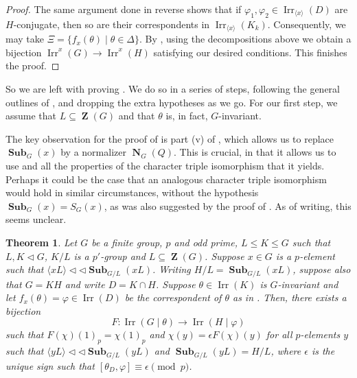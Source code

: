 \documentclass[12pt]{amsart}
\DeclareMathOperator{\ZB}{\mathbf{Z}}
\DeclareMathOperator{\NB}{\mathbf{N}}
\DeclareMathOperator{\Sub}{\mathbf{Sub}}
\DeclareMathOperator{\Irr}{Irr}
\theoremstyle{remark}
\theoremstyle{definition}
\theoremstyle{plain}
\newtheorem{thm}{Theorem}[section]
\theoremstyle{definition}
\numberwithin{equation}{section}
\begin{document}
\begin{proof}
	The same argument done in reverse shows that if $\varphi_1, \varphi_2 \in \Irr_{\langle x \rangle}(D)$ are $H$-conjugate, then so are their correspondents in $\Irr_{\langle x \rangle}(K_k)$. Consequently, we may take $\Xi = \{f_x(\theta) \mid \theta \in \Delta\}$. By , using the decompositions above we obtain a bijection $\Irr^x(G) \to \Irr^x(H)$ satisfying our desired conditions. This finishes the proof.
\end{proof}

So we are left with proving . We do so in a series of steps, following the general outlines of \cite{PickyPSolvable}, and dropping the extra hypotheses as we go. For our first step, we assume that $L \subseteq \ZB(G)$ and that $\theta$ is, in fact, $G$-invariant. 

The key observation for the proof of  is part (v) of , which allows us to replace $\Sub_G(x)$ by a normalizer $\NB_G(Q)$. This is crucial, in that it allows us to use  and all the properties of the character triple isomorphism that it yields. Perhaps it could be the case that an analogous character triple isomorphism would hold in similar circumstances, without the hypothesis $\Sub_G(x) = S_G(x)$, as was also suggested by the proof of . As of writing, this seems unclear.

\begin{thm}
	\label{Part1}
	Let $G$ be a finite group, $p$ and odd prime, $L \leq K \leq G$ such that $L, K \lhd G$, $K/L$ is a $p'$-group and $L \subseteq \ZB(G)$. Suppose $x \in G$ is a $p$-element such that $\langle xL \rangle {\triangleleft}{\triangleleft} \Sub_{G/L}(xL)$. Writing $H/L = \Sub_{G/L}(xL)$, suppose also that $G = KH$ and write $D = K \cap H$. Suppose $\theta \in \Irr(K)$ is $G$-invariant and let $f_x(\theta) = \varphi \in \Irr(D)$ be the correspondent of $\theta$ as in . Then, there exists a bijection
	\begin{equation*}
		F: \Irr(G \mid \theta) \to \Irr(H \mid \varphi)
	\end{equation*}
	such that $F(\chi)(1)_p = \chi(1)_p$ and $\chi(y) = \epsilon F(\chi)(y)$ for all $p$-elements $y$ such that $\langle yL \rangle {\triangleleft}{\triangleleft} \Sub_{G/L}(yL)$ and $\Sub_{G/L}(yL) = H/L$, where $\epsilon$ is the unique sign such that $[\theta_D, \varphi] \equiv \epsilon \pmod{p}$.
\end{thm}
\end{document}
